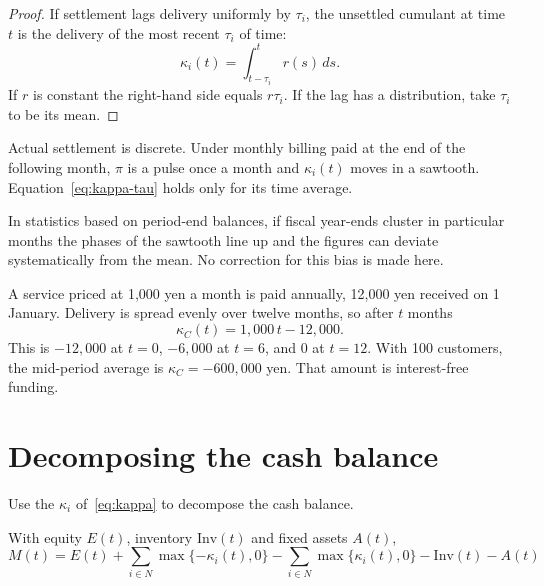 \begin{proof}
If settlement lags delivery uniformly by $\tau_i$, the unsettled cumulant at time $t$ is the
delivery of the most recent $\tau_i$ of time:
\[
\kappa_i(t) = \int_{t-\tau_i}^{t} r(s)\,ds .
\]
If $r$ is constant the right-hand side equals $r\tau_i$. If the lag has a distribution, take
$\tau_i$ to be its mean.
\end{proof}

\begin{remark}
\label{rem:kappa-tau-average}
Actual settlement is discrete. Under monthly billing paid at the end of the following month,
$\pi$ is a pulse once a month and $\kappa_i(t)$ moves in a sawtooth.
Equation~\eqref{eq:kappa-tau} holds only for its time average.

In statistics based on period-end balances, if fiscal year-ends cluster in particular months
the phases of the sawtooth line up and the figures can deviate systematically from the mean.
No correction for this bias is made here.
\end{remark}

\begin{example}
A service priced at 1{,}000 yen a month is paid annually, 12{,}000 yen received on 1 January.
Delivery is spread evenly over twelve months, so after $t$ months
\[
\kappa_C(t) = 1{,}000\,t - 12{,}000 .
\]
This is $-12{,}000$ at $t=0$, $-6{,}000$ at $t=6$, and $0$ at $t=12$.
With 100 customers, the mid-period average is $\kappa_C = -600{,}000$ yen.
That amount is interest-free funding.
\end{example}

\section{Decomposing the cash balance}

Use the $\kappa_i$ of~\eqref{eq:kappa} to decompose the cash balance.

\begin{proposition}
\label{prop:cash}
With equity $E(t)$, inventory $\mathrm{Inv}(t)$ and fixed assets $A(t)$,
\begin{equation}
M(t) = E(t) + \sum_{i\in N}\max\{-\kappa_i(t),0\} - \sum_{i\in N}\max\{\kappa_i(t),0\}
- \mathrm{Inv}(t) - A(t)
\label{eq:cash}
\end{equation}
\end{proposition}

